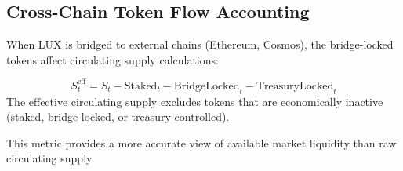 \subsection{Cross-Chain Token Flow Accounting}

When LUX is bridged to external chains (Ethereum, Cosmos), the bridge-locked tokens affect circulating supply calculations:

\begin{definition}
\begin{equation}
    S_t^{\text{eff}} = S_t - \text{Staked}_t - \text{BridgeLocked}_t - \text{TreasuryLocked}_t
\end{equation}
The effective circulating supply excludes tokens that are economically inactive (staked, bridge-locked, or treasury-controlled).
\end{definition}

This metric provides a more accurate view of available market liquidity than raw circulating supply.

